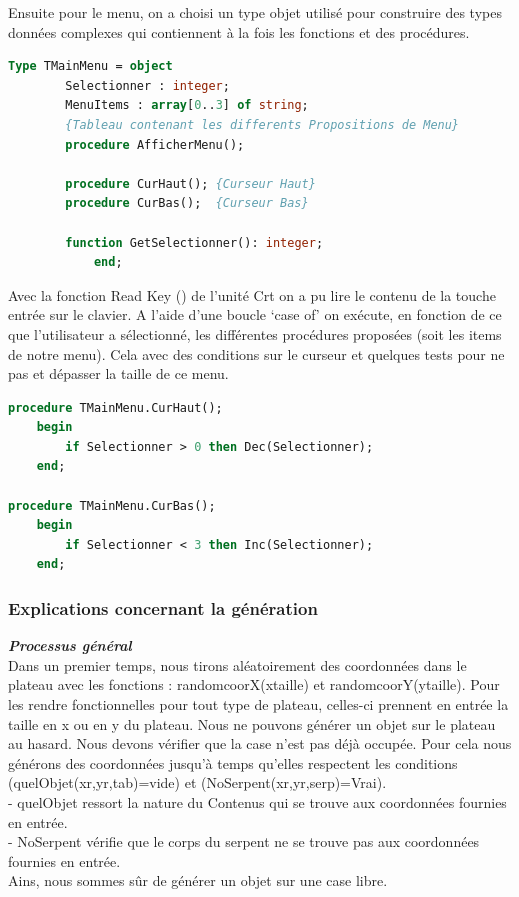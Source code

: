 \documentclass[11pt,a4paper]{article}
\begin{document}
Ensuite pour le menu, on a choisi un type objet utilisé pour construire des types données complexes qui contiennent à la fois les fonctions et des procédures.
   
   \small
         \begin{lstlisting}[language=Pascal,frame=single,caption=Code source de l'unité les menus]
Type TMainMenu = object	
        Selectionner : integer;				
        MenuItems : array[0..3] of string; 
        {Tableau contenant les differents Propositions de Menu}	
        procedure AfficherMenu();
						
        procedure CurHaut(); {Curseur Haut} 
        procedure CurBas();  {Curseur Bas}
				
        function GetSelectionner(): integer; 
            end;
         \end{lstlisting}
  
Avec la fonction Read Key () de l'unité Crt on a pu lire le contenu de la touche entrée sur le clavier. A l'aide d'une boucle ‘case of’  on exécute, en fonction de ce que l'utilisateur a sélectionné, les différentes procédures proposées (soit les items de notre menu). Cela avec des conditions sur le curseur et quelques tests pour ne pas et dépasser la taille de ce menu.\\

  \small
         \begin{lstlisting}[language=Pascal,frame=single,caption=Code source de la procédure CurHaut() et CurBas()]
procedure TMainMenu.CurHaut();
	begin
		if Selectionner > 0 then Dec(Selectionner);
	end;
	
procedure TMainMenu.CurBas();
	begin
		if Selectionner < 3 then Inc(Selectionner);
	end;
         \end{lstlisting}

        \normalsize
       


        \subsubsection{Explications concernant la génération}
        
         \textit{\textbf{Processus général}}\\
        Dans un premier temps, nous tirons aléatoirement des coordonnées dans le plateau avec les fonctions : randomcoorX(xtaille) et randomcoorY(ytaille). Pour les rendre fonctionnelles pour tout type de plateau, celles-ci prennent en entrée la taille en x ou en y du plateau. 
        Nous ne pouvons générer un objet sur le plateau au hasard. Nous devons vérifier que la case n’est pas déjà occupée. Pour cela nous générons des coordonnées jusqu’à temps qu'elles respectent les conditions (quelObjet(xr,yr,tab)=vide) et (NoSerpent(xr,yr,serp)=Vrai).\\- quelObjet ressort la nature du Contenus qui se trouve aux coordonnées fournies en      entrée.\\
        - NoSerpent vérifie que le corps du serpent ne se trouve pas aux coordonnées fournies en entrée.\\Ains, nous sommes sûr de générer un objet sur une case libre.\\
\end{document}
